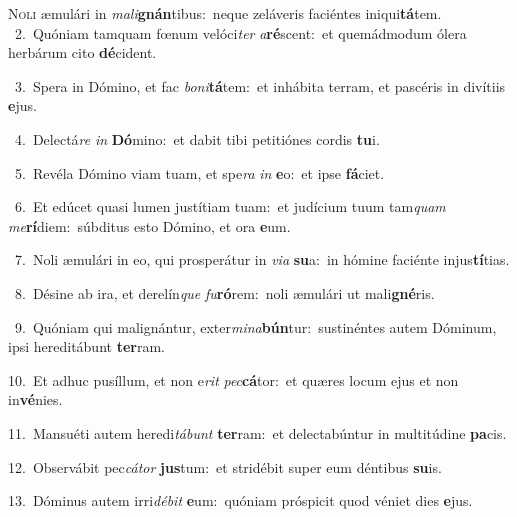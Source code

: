\lettrine{\initial\textcolor{\initialcolor}{N}}{oli} æmulári in \textit{ma}\-\textit{li}\textbf{gnán}tibus:~\star neque zeláveris faciéntes iniqui\-\textbf{tá}\-tem.\\
{\numbfont\textcolor{\numbcolor}{~2.}}~Quóniam tamquam fœnum velóci\textit{ter} \textit{a}\-\textbf{ré}scent:~\star et quemádmodum ólera herbárum cito \textbf{dé}\-cident.\par
{\numbfont\textcolor{\numbcolor}{~3.}}~Spera in Dómino, et fac \textit{bo}\-\textit{ni}\textbf{tá}tem:~\star et inhábita terram, et pascéris in divítiis \textbf{e}\-jus.\par
{\numbfont\textcolor{\numbcolor}{~4.}}~Delectá\textit{re} \textit{in} \textbf{Dó}\-mino:~\star et dabit tibi petitiónes cordis \textbf{tu}\-i.\par
{\numbfont\textcolor{\numbcolor}{~5.}}~Revéla Dómino viam tuam, et spe\textit{ra} \textit{in} \textbf{e}\-o:~\star et ipse \textbf{fá}\-ciet.\par
{\numbfont\textcolor{\numbcolor}{~6.}}~Et edúcet quasi lumen justítiam tuam:~\dagger et judícium tuum tam\textit{quam} \textit{me}\-\textbf{rí}diem:~\star súbditus esto Dómino, et ora \textbf{e}\-um.\par
{\numbfont\textcolor{\numbcolor}{~7.}}~Noli æmulári in eo, qui prosperátur in \textit{vi}\-\textit{a} \textbf{su}\-a:~\star in hómine faciénte injus\-\textbf{tí}\-tias.\par
{\numbfont\textcolor{\numbcolor}{~8.}}~Désine ab ira, et derelín\textit{que} \textit{fu}\-\textbf{ró}rem:~\star noli æmulári ut mali\-\textbf{gné}\-ris.\par
{\numbfont\textcolor{\numbcolor}{~9.}}~Quóniam qui malignántur, exter\-\textit{mi}\-\textit{na}\textbf{bún}tur:~\star sustinéntes autem Dóminum, ipsi hereditábunt \textbf{ter}\-ram.\par
{\numbfont\textcolor{\numbcolor}{10.}}~Et adhuc pusíllum, et non e\textit{rit} \textit{pec}\-\textbf{cá}tor:~\star et quæres locum ejus et non in\-\textbf{vé}\-nies.\par
{\numbfont\textcolor{\numbcolor}{11.}}~Mansuéti autem heredi\-\textit{tá}\-\textit{bunt} \textbf{ter}\-ram:~\star et delectabúntur in multitúdine \textbf{pa}\-cis.\par
{\numbfont\textcolor{\numbcolor}{12.}}~Observábit pec\-\textit{cá}\-\textit{tor} \textbf{jus}\-tum:~\star et stridébit super eum déntibus \textbf{su}\-is.\par
{\numbfont\textcolor{\numbcolor}{13.}}~Dóminus autem irri\-\textit{dé}\-\textit{bit} \textbf{e}\-um:~\star quóniam próspicit quod véniet dies \textbf{e}\-jus.\par
